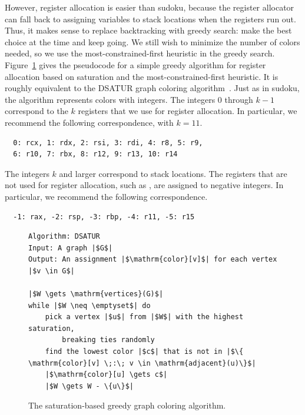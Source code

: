 \documentclass[7x10]{TimesAPriori_MIT}%
\numberwithin{theorem}{chapter}
\numberwithin{definition}{chapter}
\numberwithin{equation}{chapter}
\begin{document}
However, register allocation is easier than sudoku, because the
register allocator can fall back to assigning variables to stack
locations when the registers run out. Thus, it makes sense to replace
backtracking with greedy search: make the best choice at the time and
keep going. We still wish to minimize the number of colors needed, so
we use the most-constrained-first heuristic in the greedy search.
Figure~\ref{fig:satur-algo} gives the pseudocode for a simple greedy
algorithm for register allocation based on saturation and the
most-constrained-first heuristic. It is roughly equivalent to the
DSATUR graph coloring algorithm~\citep{Brelaz:1979eu}.  Just as in
sudoku, the algorithm represents colors with integers. The integers
$0$ through $k-1$ correspond to the $k$ registers that we use for
register allocation. In particular, we recommend the following
correspondence, with $k=11$.
\begin{lstlisting}
  0: rcx, 1: rdx, 2: rsi, 3: rdi, 4: r8, 5: r9,
  6: r10, 7: rbx, 8: r12, 9: r13, 10: r14
\end{lstlisting}
The integers $k$ and larger correspond to stack locations. The
registers that are not used for register allocation, such as
, are assigned to negative integers. In particular, we
recommend the following correspondence.
\begin{lstlisting}
  -1: rax, -2: rsp, -3: rbp, -4: r11, -5: r15
\end{lstlisting}


\begin{figure}[btp]
\begin{tcolorbox}[colback=white]
  \centering
\begin{lstlisting}[basicstyle=\rmfamily,deletekeywords={for,from,with,is,not,in,find},morekeywords={while},columns=fullflexible]
Algorithm: DSATUR
Input: A graph |$G$|
Output: An assignment |$\mathrm{color}[v]$| for each vertex |$v \in G$|

|$W \gets \mathrm{vertices}(G)$|
while |$W \neq \emptyset$| do
    pick a vertex |$u$| from |$W$| with the highest saturation,
        breaking ties randomly
    find the lowest color |$c$| that is not in |$\{ \mathrm{color}[v] \;:\; v \in \mathrm{adjacent}(u)\}$|
    |$\mathrm{color}[u] \gets c$|
    |$W \gets W - \{u\}$|
\end{lstlisting}
\end{tcolorbox}
\caption{The saturation-based greedy graph coloring algorithm.}
  \label{fig:satur-algo}
\end{figure}
\end{document}
